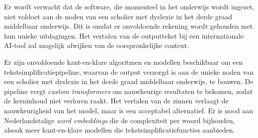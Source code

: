 Er wordt verwacht dat de software, die momenteel in het onderwijs wordt ingezet, niet voldoet aan de noden van een scholier met dyslexie in het derde graad middelbaar onderwijs. Dit is omdat er onvoldoende rekening wordt gehouden met hun unieke uitdagingen. Het vertalen van de outputtekst bij een internationale AI-tool zal mogelijk afwijken van de oorspronkelijke context. 

Er zijn onvoldoende kant-en-klare algoritmen en modellen beschikbaar om een tekstsimplificatiepipeline, waarvan de output verzorgd is aan de unieke noden van een scholier met dyslexie in het derde graad middelbaar onderwijs, te bouwen. De pipeline vergt \textit{custom transformers} om nauwkeurige resultaten te bekomen, zodat de kerninhoud niet verloren raakt. Het vertalen van de zinnen verlaagt de nauwkeurigheid van het model, maar is een acceptabel alternatief. Er is nood aan Nederlandstalige \textit{word embeddings} die de complexiteit per woord bijhouden, alsook meer kant-en-klare modellen die tekstsimplificatiefuncties aanbieden.